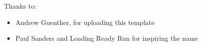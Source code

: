 \noindent
Thanks to:
\begin{itemize}
    \item Andrew Guenther, for uploading this template
    \item Paul Sanders and Loading Ready Run for inspiring the name
\end{itemize}
